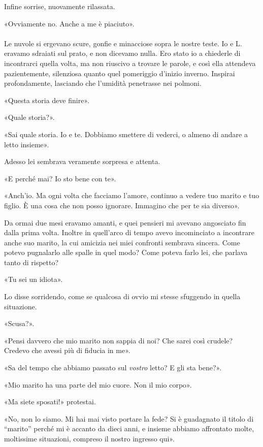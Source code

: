 \documentclass[a4paper,12pt]{book}
\begin{document}
Infine sorrise, nuovamente rilassata.

«Ovviamente no. Anche a me è piaciuto».

\paragraph{}
Le nuvole si ergevano scure, gonfie e minacciose sopra le nostre teste. Io e L.
eravamo sdraiati sul prato, e non dicevamo nulla. Ero stato io a chiederle di
incontrarci quella volta, ma non riuscivo a trovare le parole, e così ella
attendeva pazientemente, silenziosa quanto quel pomeriggio d'inizio inverno.
Inspirai profondamente, lasciando che l'umidità penetrasse nei polmoni.

«Questa storia deve finire».

«Quale storia?».

«Sai quale storia. Io e te. Dobbiamo smettere di vederci, o almeno di andare a
letto insieme».

Adesso lei sembrava veramente sorpresa e attenta.

«E perché mai? Io sto bene con te».

«Anch'io. Ma ogni volta che facciamo l'amore, continuo a vedere tuo marito e tuo
figlio. È una cosa che non posso ignorare. Immagino che per te sia diverso».

Da ormai due mesi eravamo amanti, e quei pensieri mi avevano angosciato fin
dalla prima volta. Inoltre in quell'arco di tempo avevo incominciato a
incontrare anche suo marito, la cui amicizia nei miei confronti sembrava
sincera. Come potevo pugnalarlo alle spalle in quel modo? Come poteva farlo lei,
che parlava tanto di rispetto?

«Tu sei un idiota».

Lo disse sorridendo, come se qualcosa di ovvio mi stesse sfuggendo in quella
situazione.

«Scusa?».

«Pensi davvero che mio marito non sappia di noi? Che sarei così crudele? Credevo
che avessi più di fiducia in me».

«Sa del tempo che abbiamo passato sul \emph{vostro} letto? E gli sta bene?».

«Mio marito ha una parte del mio cuore. Non il mio corpo».

«Ma siete sposati!» protestai.

«No, non lo siamo. Mi hai mai visto portare la fede? Si è guadagnato il titolo
di ``marito'' perché mi è accanto da dieci anni, e insieme abbiamo affrontato
molte, moltissime situazioni, compreso il nostro ingresso qui».
\end{document}
